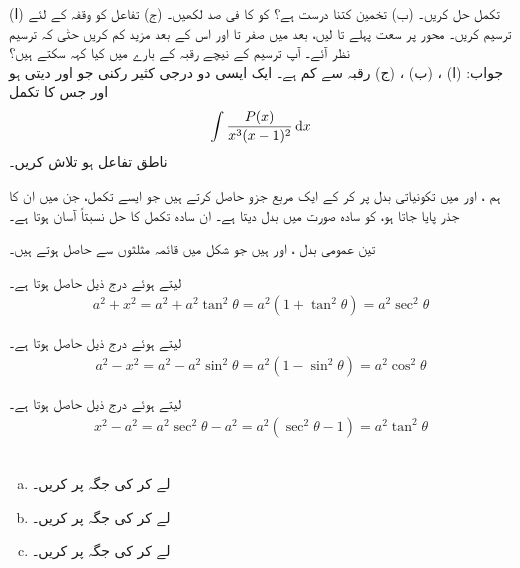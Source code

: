 (ا) تکمل  حل کریں۔ (ب) تخمین  کتنا درست ہے؟  کو  کا فی صد لکھیں۔ (ج) تفاعل  کو وقفہ  کے لئے ترسیم کریں۔ محور  پر سعت پہلے  تا  لیں، بعد میں  صفر تا  اور اس کے بعد مزید کم کریں حتٰی کہ ترسیم نظر آئے۔ آپ ترسیم کے نیچے رقبہ کے بارے میں کیا کہہ سکتے ہیں؟\\
جواب:\quad
(ا) ، (ب) ، (ج) رقبہ  سے کم ہے۔
ایک ایسی دو درجی کثیر رکنی  جو  اور  دیتی ہو اور جس کا تکمل 
\begin{align*}
\int \frac{P(x)}{x^3(x-1)^2}\dif x
\end{align*}
ناطق تفاعل ہو تلاش کریں۔

ہم ،  اور  میں تکونیاتی بدل پر کر کے  ایک مربع جزو حاصل کرتے ہیں جو ایسے تکمل، جن میں ان کا جذر پایا جاتا ہو، کو سادہ صورت میں بدل دیتا ہے۔ ان سادہ تکمل کا حل نسبتاً آسان  ہوتا ہے۔

تین عمومی بدل ،  اور  ہیں جو شکل  میں قائمہ مثلثوں سے حاصل ہوتے ہیں۔

 لیتے ہوئے درج ذیل حاصل ہوتا ہے۔
\begin{align}
a^2+x^2=a^2+a^2\tan^2\theta=a^2(1+\tan^2\theta)=a^2\sec^2\theta
\end{align}

 لیتے ہوئے درج ذیل حاصل ہوتا ہے۔
\begin{align}
a^2-x^2=a^2-a^2\sin^2\theta=a^2(1-\sin^2\theta)=a^2\cos^2\theta
\end{align}

 لیتے ہوئے درج ذیل حاصل ہوتا ہے۔
\begin{align}
x^2-a^2=a^2\sec^2\theta-a^2=a^2(\sec^2\theta-1)=a^2\tan^2\theta
\end{align}
\\
\begin{enumerate}[a.]
\item
{} لے کر  کی جگہ  پر کریں۔
\item
{} لے کر  کی جگہ  پر کریں۔
\item
{} لے کر  کی جگہ  پر کریں۔
\end{enumerate}


